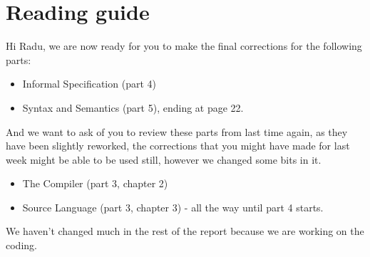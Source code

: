 \section{Reading guide}
Hi Radu, we are now ready for you to make the final corrections for the following parts:
\begin{itemize}
\item Informal Specification (part 4) 
\item Syntax and Semantics (part 5), ending at page 22.
\end{itemize}

And we want to ask of you to review these parts from last time again, as they have been slightly reworked, the corrections that you might have made for last week might be able to be used still, however we changed some bits in it.
\begin{itemize}
\item The Compiler (part 3, chapter 2)
\item Source Language (part 3, chapter 3) - all the way until part 4 starts.
\end{itemize}

We haven't changed much in the rest of the report because we are working on the coding.